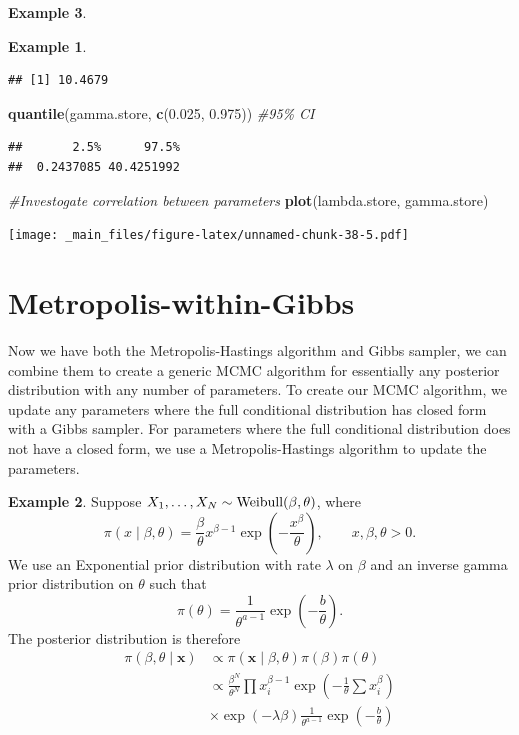 \documentclass[
]{book}
\newenvironment{Shaded}{\begin{snugshade}}{\end{snugshade}}
\newcommand{\CommentTok}[1]{\textcolor[rgb]{0.56,0.35,0.01}{\textit{#1}}}
\newcommand{\FloatTok}[1]{\textcolor[rgb]{0.00,0.00,0.81}{#1}}
\newcommand{\FunctionTok}[1]{\textcolor[rgb]{0.13,0.29,0.53}{\textbf{#1}}}
\newcommand{\NormalTok}[1]{#1}
\theoremstyle{definition}
\theoremstyle{definition}
\newtheorem{example}{Example}[chapter]
\theoremstyle{definition}
\theoremstyle{definition}
\theoremstyle{remark}
\begin{document}
\begin{example}
\begin{example}
\begin{verbatim}
## [1] 10.4679
\end{verbatim}

\begin{Shaded}
\begin{Highlighting}[]
\FunctionTok{quantile}\NormalTok{(gamma.store, }\FunctionTok{c}\NormalTok{(}\FloatTok{0.025}\NormalTok{, }\FloatTok{0.975}\NormalTok{)) }\CommentTok{\#95\% CI}
\end{Highlighting}
\end{Shaded}

\begin{verbatim}
##       2.5%      97.5% 
##  0.2437085 40.4251992
\end{verbatim}

\begin{Shaded}
\begin{Highlighting}[]
\CommentTok{\#Investogate correlation between parameters}
\FunctionTok{plot}\NormalTok{(lambda.store, gamma.store)}
\end{Highlighting}
\end{Shaded}

\texttt{[image: \_main\_files/figure-latex/unnamed-chunk-38-5.pdf]}
\end{example}

\hypertarget{metropolis-within-gibbs}{%
\section{Metropolis-within-Gibbs}\label{metropolis-within-gibbs}}

Now we have both the Metropolis-Hastings algorithm and Gibbs sampler, we can combine them to create a generic MCMC algorithm for essentially any posterior distribution with any number of parameters. To create our MCMC algorithm, we update any parameters where the full conditional distribution has closed form with a Gibbs sampler. For parameters where the full conditional distribution does not have a closed form, we use a Metropolis-Hastings algorithm to update the parameters.

\begin{example}
Suppose \(X_1, \ldots, X_N \sim \hbox{Weibull}(\beta, \theta)\), where
\[
\pi(x \mid\beta,\theta) = \frac{\beta}{\theta}x^{\beta - 1}\exp\left(-\frac{x^\beta}{\theta}\right), \qquad x, \beta, \theta > 0. 
\]
We use an Exponential prior distribution with rate \(\lambda\) on \(\beta\) and an inverse gamma prior distribution on \(\theta\) such that
\[
\pi(\theta) = \frac{1}{\theta^{a - 1}}\exp\left(-\frac{b}{\theta}\right).
\]
The posterior distribution is therefore
\begin{align*}
\pi(\beta, \theta \mid \boldsymbol{x}) &\propto \pi(\boldsymbol{x} \mid \beta, \theta)\pi(\beta)\pi(\theta) \\
&\propto \frac{\beta^N}{\theta^N}\prod x_i^{\beta - 1}\exp\left(-\frac{1}{\theta}\sum x_i^\beta\right)
\\
&\times\exp(-\lambda\beta) \frac{1}{\theta^{a - 1}}\exp\left(-\frac{b}{\theta}\right)
\end{align*}


\end{example}
\end{example}
\end{document}
